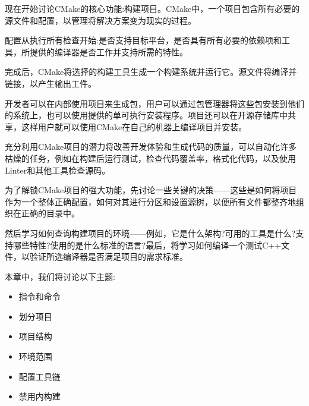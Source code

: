 现在开始讨论CMake的核心功能:构建项目。CMake中，一个项目包含所有必要的源文件和配置，以管理将解决方案变为现实的过程。

配置从执行所有检查开始:是否支持目标平台，是否具有所有必要的依赖项和工具，所提供的编译器是否工作并支持所需的特性。

完成后，CMake将选择的构建工具生成一个构建系统并运行它。源文件将编译并链接，以产生输出工件。

开发者可以在内部使用项目来生成包，用户可以通过包管理器将这些包安装到他们的系统上，也可以使用提供的单可执行安装程序。项目还可以在开源存储库中共享，这样用户就可以使用CMake在自己的机器上编译项目并安装。

充分利用CMake项目的潜力将改善开发体验和生成代码的质量，可以自动化许多枯燥的任务，例如在构建后运行测试，检查代码覆盖率，格式化代码，以及使用Linter和其他工具检查源码。

为了解锁CMake项目的强大功能，先讨论一些关键的决策——这些是如何将项目作为一个整体正确配置，如何对其进行分区和设置源树，以便所有文件都整齐地组织在正确的目录中。

然后学习如何查询构建项目的环境——例如，它是什么架构?可用的工具是什么?支持哪些特性?使用的是什么标准的语言?最后，将学习如何编译一个测试C++文件，以验证所选编译器是否满足项目的需求标准。

本章中，我们将讨论以下主题:

\begin{itemize}
\item 
指令和命令

\item 
划分项目

\item 
项目结构

\item 
环境范围

\item 
配置工具链

\item 
禁用内构建
\end{itemize}


